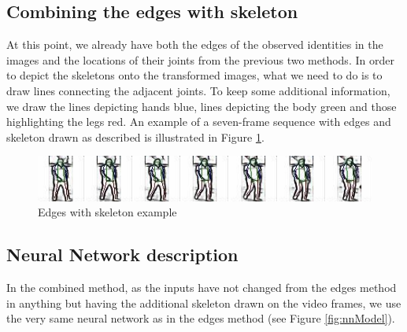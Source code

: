 \subsection{Combining the edges with skeleton}
At this point, we already have both the edges of the observed identities in the images and the locations of their joints from the previous two methods. In order to depict the skeletons onto the transformed images, what we need to do is to draw lines connecting the adjacent joints. To keep some additional information, we draw the lines depicting hands blue, lines depicting the body green and those highlighting the legs red. An example of a seven-frame sequence with edges and skeleton drawn as described is illustrated in Figure \ref{fig:edges_with_skeleton}.

\begin{figure}[h!]
    \centering
    \includegraphics[scale=0.8]{figures/edges_with_skeleton.png}
    \caption{Edges with skeleton example}
    \label{fig:edges_with_skeleton}
\end{figure}

\subsection{Neural Network description}
In the combined method, as the inputs have not changed from the edges method in anything but having the additional skeleton drawn on the video frames, we use the very same neural network as in the edges method (see Figure \ref{fig:nnModel}). 
